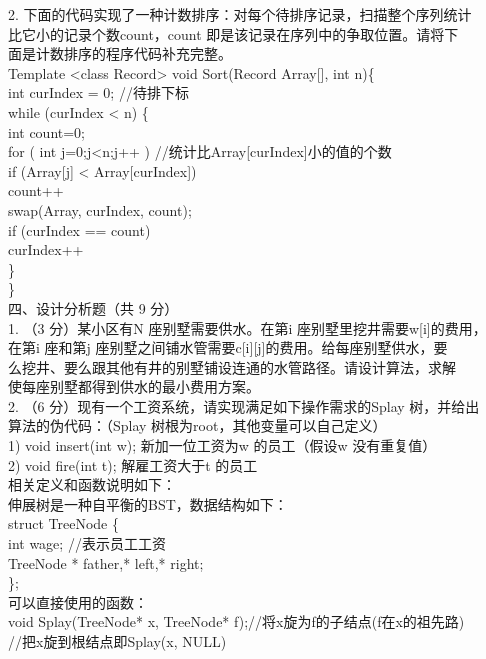 \begin{question}
2. 下面的代码实现了一种计数排序：对每个待排序记录，扫描整个序列统计\\
比它小的记录个数count，count 即是该记录在序列中的争取位置。请将下\\
面是计数排序的程序代码补充完整。\\
Template <class Record> void Sort(Record Array[], int n)\{\\
int curIndex = 0;        //待排下标\\
while (curIndex < n) \{\\
int count=0;\\
for ( int j=0;j<n;j++ )  //统计比Array[curIndex]小的值的个数\\
if (Array[j] < Array[curIndex])\\
count++\\
swap(Array, curIndex, count);\\
if (curIndex == count)\\
curIndex++\\
\}\\
\}\\
四、设计分析题（共 9 分）\\
1. （3 分）某小区有N 座别墅需要供水。在第i 座别墅里挖井需要w[i]的费用，\\
在第i 座和第j 座别墅之间铺水管需要c[i][j]的费用。给每座别墅供水，要\\
么挖井、要么跟其他有井的别墅铺设连通的水管路径。请设计算法，求解\\
使每座别墅都得到供水的最小费用方案。\\
2. （6 分）现有一个工资系统，请实现满足如下操作需求的Splay 树，并给出\\
算法的伪代码：（Splay 树根为root，其他变量可以自己定义）\\
1) void insert(int w);  新加一位工资为w 的员工（假设w 没有重复值）\\
2) void fire(int t);     解雇工资大于t 的员工\\
相关定义和函数说明如下：\\
伸展树是一种自平衡的BST，数据结构如下：\\
struct TreeNode \{\\
int   wage;           //表示员工工资\\
TreeNode * father,* left,* right;\\
\};\\
可以直接使用的函数：\\
void Splay(TreeNode* x, TreeNode* f);//将x旋为f的子结点(f在x的祖先路)\\
//把x旋到根结点即Splay(x, NULL)\\

\end{question}

